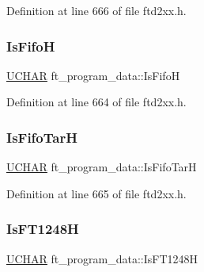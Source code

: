 Definition at line 666 of file ftd2xx.\+h.

\mbox{\label{structft__program__data_a38ce59e2b1723db2d14addfceecabecb}} 
\subsubsection{\texorpdfstring{Is\+FifoH}{IsFifoH}}
{\footnotesize\ttfamily \hyperlink{CatCaloProto40MHz_2inc_2WinTypes_8h_a4f4bb67531a9bf6f0b9c6ad76aeba587}{U\+C\+H\+AR} ft\+\_\+program\+\_\+data\+::\+Is\+FifoH}



Definition at line 664 of file ftd2xx.\+h.

\mbox{\label{structft__program__data_ab9cf4df075da21102def2162c3d281d1}} 
\subsubsection{\texorpdfstring{Is\+Fifo\+TarH}{IsFifoTarH}}
{\footnotesize\ttfamily \hyperlink{CatCaloProto40MHz_2inc_2WinTypes_8h_a4f4bb67531a9bf6f0b9c6ad76aeba587}{U\+C\+H\+AR} ft\+\_\+program\+\_\+data\+::\+Is\+Fifo\+TarH}



Definition at line 665 of file ftd2xx.\+h.

\mbox{\label{structft__program__data_a449c65a49b91d6c34045632b662834ab}} 
\subsubsection{\texorpdfstring{Is\+F\+T1248H}{IsFT1248H}}
{\footnotesize\ttfamily \hyperlink{CatCaloProto40MHz_2inc_2WinTypes_8h_a4f4bb67531a9bf6f0b9c6ad76aeba587}{U\+C\+H\+AR} ft\+\_\+program\+\_\+data\+::\+Is\+F\+T1248H}



